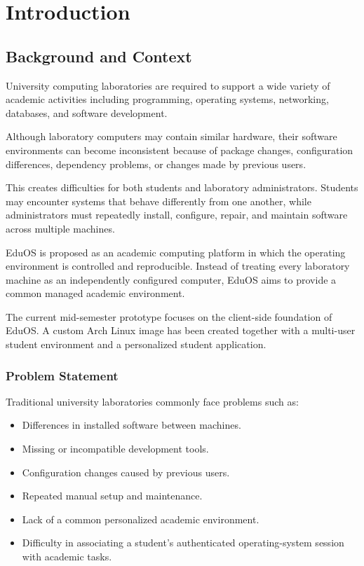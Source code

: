 \documentclass{tietreport}
\author{%
    \texttt{1024170276} Dhawal Singh Jamwal \\
    \texttt{1024170275} Aaditya Kumar Yadav \\
    \texttt{1024170283} Harshit%
}
\begin{document}
\maketitle

\tableofcontents



\chapter{Introduction}

\section{Background and Context}

University computing laboratories are required to support a wide
variety of academic activities including programming, operating
systems, networking, databases, and software development.

Although laboratory computers may contain similar hardware, their
software environments can become inconsistent because of package
changes, configuration differences, dependency problems, or changes
made by previous users.

This creates difficulties for both students and laboratory
administrators. Students may encounter systems that behave
differently from one another, while administrators must repeatedly
install, configure, repair, and maintain software across multiple
machines.

EduOS is proposed as an academic computing platform in which the
operating environment is controlled and reproducible. Instead of
treating every laboratory machine as an independently configured
computer, EduOS aims to provide a common managed academic
environment.

The current mid-semester prototype focuses on the client-side
foundation of EduOS. A custom Arch Linux image has been created
together with a multi-user student environment and a personalized
student application.

\subsection{Problem Statement}

Traditional university laboratories commonly face problems such as:

\begin{itemize}
    \item Differences in installed software between machines.
    \item Missing or incompatible development tools.
    \item Configuration changes caused by previous users.
    \item Repeated manual setup and maintenance.
    \item Lack of a common personalized academic environment.
    \item Difficulty in associating a student's authenticated
          operating-system session with academic tasks.
\end{itemize}
\end{document}
